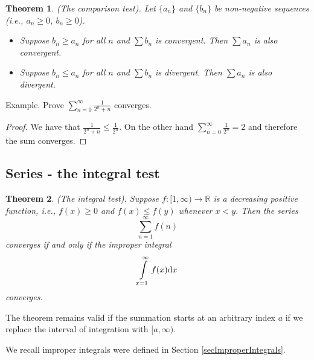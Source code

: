 \documentclass[12pt]{book}
\newtheorem{theorem}{Theorem}[section]
\begin{document}
\begin{theorem}\label{thSeriesComparisonTest} (The comparison test). Let $\{a_n\}$ and $\{b_n\}$ be non-negative sequences (i.e., $a_n\geq 0$, $b_n\geq 0$).
\begin{itemize}
\item Suppose $b_n\geq a_n$ for all $n$ and $\sum b_n$ is convergent. Then $\sum a_n$ is also convergent.
\item Suppose  $b_n\leq a_n$ for all $n$ and $\sum b_n$ is divergent. Then $\sum a_n$ is also divergent.
\end{itemize}
\end{theorem}

Example. Prove $\sum_{n=0}^{\infty}\frac{1}{2^n+n}$ converges.

\begin{proof}
We have that $\frac{1}{2^n+n}\leq\frac{1}{2^n}$. On the other hand $\sum_{n= 0}^{\infty} \frac{1}{2^n}=2$ and therefore the sum converges.
\end{proof}


\subsection{Series - the integral test}
\begin{theorem} \label{thIntegralConvergenceTest} (The integral test). Suppose $f:[1, \infty)\to \mathbb R$ is a decreasing positive function, i.e., $f(x)\geq 0$ and $f(x)\leq f(y)$ whenever $x<y$. Then the series
\[
\sum_{n=1}^{\infty} f(n)
\]
converges if and only if the improper integral
\[
\int\limits_{x=1}^{\infty}f(x){\normalfont \text{d}} x
\]
converges.
\end{theorem}
The theorem remains valid if the summation starts at an arbitrary index $a$ if we replace the interval of integration with $[a, \infty)$.

We recall improper integrals were defined in Section \ref{secImproperIntegrals}.
\end{document}
